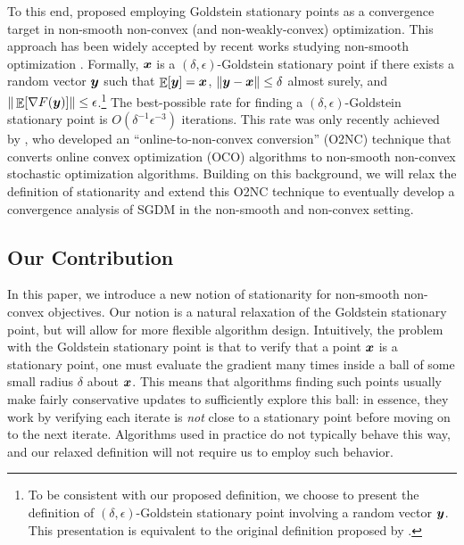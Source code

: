 To this end, \citet{zhang2020complexity} proposed employing Goldstein stationary points \citep{goldstein1977optimization} as a convergence target in non-smooth non-convex (and non-weakly-convex) optimization. This approach has been widely accepted by recent works studying non-smooth optimization \cite{kornowski2022complexity, lin2022gradient, kornowski2023algorithm, cutkosky2023optimal}. Formally, ${\boldsymbol{x}}$ is a $(\delta,\epsilon)$-Goldstein stationary point if there exists a random vector ${\boldsymbol{y}}$ such that $\mathop{\mathbb{E}}[{\boldsymbol{y}}]={\boldsymbol{x}}$, $\|{\boldsymbol{y}}-{\boldsymbol{x}}\| \le \delta$ almost surely, and $\|\mathop{\mathbb{E}}[\nabla F({\boldsymbol{y}})]\|\le\epsilon$.\footnote{To be consistent with our proposed definition, we choose to present the definition of $(\delta,\epsilon)$-Goldstein stationary point involving a random vector ${\boldsymbol{y}}$. This presentation is equivalent to the original definition proposed by \cite{zhang2020complexity}.} The best-possible rate for finding a $(\delta,\epsilon)$-Goldstein stationary point is $O(\delta^{-1}\epsilon^{-3})$ iterations. This rate was only recently achieved  by \citet{cutkosky2023optimal}, who developed an ``online-to-non-convex conversion'' (O2NC) technique that converts online convex optimization (OCO) algorithms to non-smooth non-convex stochastic optimization algorithms. Building on this background, we will relax the definition of stationarity and extend this O2NC technique to eventually develop a convergence analysis of SGDM in the non-smooth and non-convex setting.


\subsection{Our Contribution}

In this paper, we introduce a new notion of stationarity for non-smooth non-convex objectives. Our notion is a natural relaxation of the Goldstein stationary point, but will allow for  more flexible algorithm design. Intuitively, the problem with the Goldstein stationary point is that to verify that a point ${\boldsymbol{x}}$ is a stationary point, one must evaluate the gradient many times inside a ball of some small radius $\delta$ about ${\boldsymbol{x}}$. This means that algorithms finding such points usually make fairly conservative updates to sufficiently explore this ball: in essence, they work by verifying each iterate is \emph{not} close to a stationary point before moving on to the next iterate. Algorithms used in practice do not typically behave this way, and our relaxed definition will not require us to employ such behavior.

